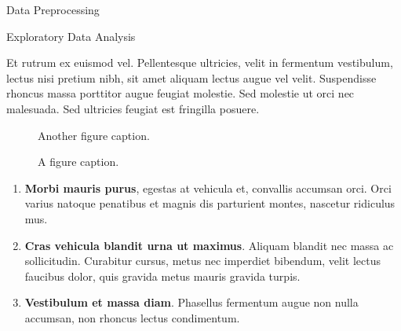\documentclass[final]{beamer}
\newlength{\colwidth}
\begin{document}
\begin{frame}[t]
\begin{columns}[t]
\begin{column}{\colwidth}
  \begin{block}{Data Preprocessing}
  \end{block}
\begin{block}{Exploratory Data Analysis}

    Et rutrum ex euismod vel. Pellentesque ultricies, velit in fermentum
    vestibulum, lectus nisi pretium nibh, sit amet aliquam lectus augue vel
    velit. Suspendisse rhoncus massa porttitor augue feugiat molestie. Sed
    molestie ut orci nec malesuada. Sed ultricies feugiat est fringilla
    posuere.

    \begin{figure}
      \centering
      \caption{Another figure caption.}
    \end{figure}
    \begin{figure}
      \centering
      \caption{A figure caption.}
    \end{figure}
    \begin{enumerate}
      \item \textbf{Morbi mauris purus}, egestas at vehicula et, convallis
        accumsan orci. Orci varius natoque penatibus et magnis dis parturient
        montes, nascetur ridiculus mus.
      \item \textbf{Cras vehicula blandit urna ut maximus}. Aliquam blandit nec
        massa ac sollicitudin. Curabitur cursus, metus nec imperdiet bibendum,
        velit lectus faucibus dolor, quis gravida metus mauris gravida turpis.
      \item \textbf{Vestibulum et massa diam}. Phasellus fermentum augue non
        nulla accumsan, non rhoncus lectus condimentum.
    \end{enumerate}


\end{block}
\end{column}
\end{columns}
\end{frame}
\end{document}
